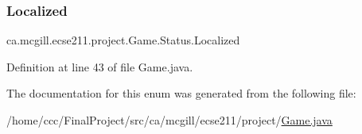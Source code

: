 \subsubsection{\texorpdfstring{Localized}{Localized}}
{\footnotesize\ttfamily ca.\+mcgill.\+ecse211.\+project.\+Game.\+Status.\+Localized}



Definition at line 43 of file Game.\+java.



The documentation for this enum was generated from the following file\+:\begin{DoxyCompactItemize}
\item 
/home/ccc/\+Final\+Project/src/ca/mcgill/ecse211/project/\hyperlink{_game_8java}{Game.\+java}\end{DoxyCompactItemize}
